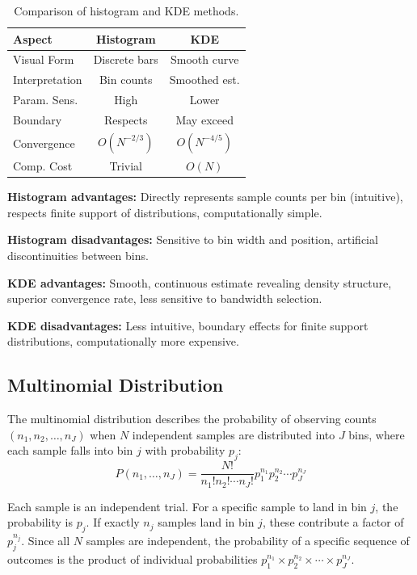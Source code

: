 \documentclass[
	a4paper, %
	10pt, %
	twoside, %
]{LTJournalArticle}
\begin{document}
\begin{table}[h] %
	\caption{Comparison of histogram and KDE methods.}
	\centering
	\footnotesize
	\begin{tabular}{@{}lcc@{}}
		\toprule
		\textbf{Aspect} & \textbf{Histogram} & \textbf{KDE}  \\
		\midrule
		Visual Form     & Discrete bars      & Smooth curve  \\
		Interpretation  & Bin counts         & Smoothed est. \\
		Param. Sens.    & High               & Lower         \\
		Boundary        & Respects           & May exceed    \\
		Convergence     & $O(N^{-2/3})$      & $O(N^{-4/5})$ \\
		Comp. Cost      & Trivial            & $O(N)$        \\
		\bottomrule
	\end{tabular}
	\label{tab:comparison}
\end{table}

\textbf{Histogram advantages:} Directly represents sample counts per bin (intuitive), respects finite support of distributions, computationally simple.

\textbf{Histogram disadvantages:} Sensitive to bin width and position, artificial discontinuities between bins.

\textbf{KDE advantages:} Smooth, continuous estimate revealing density structure, superior convergence rate, less sensitive to bandwidth selection.

\textbf{KDE disadvantages:} Less intuitive, boundary effects for finite support distributions, computationally more expensive.

\subsection{Multinomial Distribution}

The multinomial distribution describes the probability of observing counts $(n_1, n_2, \ldots, n_J)$ when $N$ independent samples are distributed into $J$ bins, where each sample falls into bin $j$ with probability $p_j$:
\begin{equation}
	P(n_1, \ldots, n_J) = \frac{N!}{n_1! n_2! \cdots n_J!} p_1^{n_1} p_2^{n_2} \cdots p_J^{n_J}
	\label{eq:multinomial}
\end{equation}

Each sample is an independent trial. For a specific sample to land in bin $j$, the probability is $p_j$. If exactly $n_j$ samples land in bin $j$, these contribute a factor of $p_j^{n_j}$. Since all $N$ samples are independent, the probability of a specific sequence of outcomes is the product of individual probabilities $p_1^{n_1} \times p_2^{n_2} \times \cdots \times p_J^{n_J}$.
\end{document}
